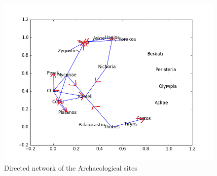 \begin{figure}
\includegraphics[width=\textwidth]{Overall_network_direct.png}
\caption{Directed network of the Archaeological sites}
\label{fig:overall}
\end{figure}
